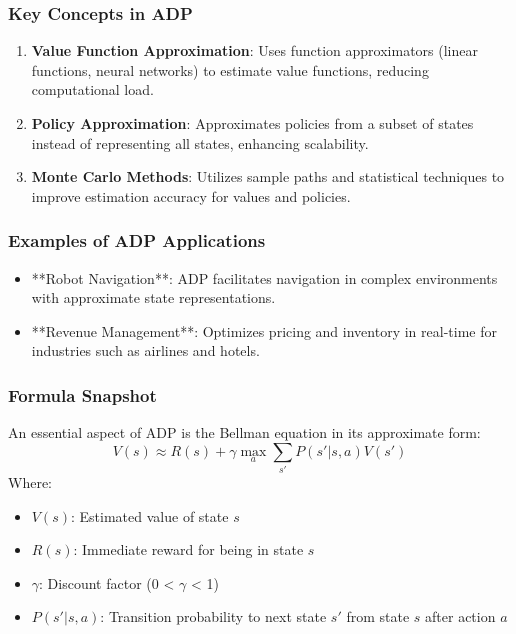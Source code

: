 \documentclass[aspectratio=169]{beamer}
\begin{document}
\begin{frame}[fragile]
    \frametitle{Key Concepts in ADP}
    \begin{enumerate}
        \item \textbf{Value Function Approximation}: Uses function approximators (linear functions, neural networks) to estimate value functions, reducing computational load.
        
        \item \textbf{Policy Approximation}: Approximates policies from a subset of states instead of representing all states, enhancing scalability.
        
        \item \textbf{Monte Carlo Methods}: Utilizes sample paths and statistical techniques to improve estimation accuracy for values and policies.
    \end{enumerate}
\end{frame}

\begin{frame}[fragile]
    \frametitle{Examples of ADP Applications}
    \begin{itemize}
        \item **Robot Navigation**: ADP facilitates navigation in complex environments with approximate state representations.
        \item **Revenue Management**: Optimizes pricing and inventory in real-time for industries such as airlines and hotels.
    \end{itemize}
\end{frame}

\begin{frame}[fragile]
    \frametitle{Formula Snapshot}
    An essential aspect of ADP is the Bellman equation in its approximate form:
    \begin{equation}
        V(s) \approx R(s) + \gamma \max_{a} \sum_{s'} P(s' | s, a) V(s') 
    \end{equation}
    Where:
    \begin{itemize}
        \item \( V(s) \): Estimated value of state \( s \)
        \item \( R(s) \): Immediate reward for being in state \( s \)
        \item \( \gamma \): Discount factor (0 < \( \gamma \) < 1)
        \item \( P(s' | s, a) \): Transition probability to next state \( s' \) from state \( s \) after action \( a \)
    \end{itemize}
\end{frame}
\end{document}
